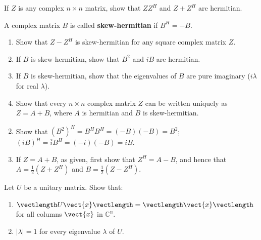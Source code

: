 \begin{multicols}{2}
\begin{ex}
If $Z$ is any complex $n \times n$ matrix, show that $ZZ^{H}$ and $Z + Z^{H}$ are hermitian.
\end{ex}

\begin{ex}
A complex matrix $B$ is called \textbf{skew-hermitian} if $B^{H} = -B$.


\begin{enumerate}[label={\alph*.}]
\item Show that $Z - Z^{H}$ is skew-hermitian for any square complex matrix $Z$.

\item If $B$ is skew-hermitian, show that $B^{2}$ and $iB$ are hermitian.

\item If $B$ is skew-hermitian, show that the eigenvalues of $B$ are pure imaginary ($i \lambda$ for real $\lambda$).

\item Show that every $n \times n$ complex matrix $Z$ can be written uniquely as $Z = A + B$, where $A$ is hermitian and $B$ is skew-hermitian.

\end{enumerate}
\begin{sol}
\begin{enumerate}[label={\alph*.}]
\setcounter{enumi}{1}
\item  Show that $(B^2)^H = B^HB^H = (-B)(-B) = B^2$; $(iB)^H = \overline{i}B^H = (-i)(-B) = iB$.


\setcounter{enumi}{3}
\item  If $Z = A + B$, as given, first show that $Z^{H} = A - B$, and hence that $A = \frac{1}{2}(Z + Z^{H})$ and $B = \frac{1}{2}(Z - Z^{H})$.

\end{enumerate}
\end{sol}
\end{ex}

\begin{ex}
Let $U$ be a unitary matrix. Show that:

\begin{enumerate}[label={\alph*.}]
\item $\vectlength U\vect{x} \vectlength = \vectlength \vect{x} \vectlength$ for all columns $\vect{x}$ in $\mathbb{C}^n$.

\item $|\lambda| = 1$ for every eigenvalue $\lambda$ of $U$.


\end{enumerate}
\end{ex}
\end{multicols}

